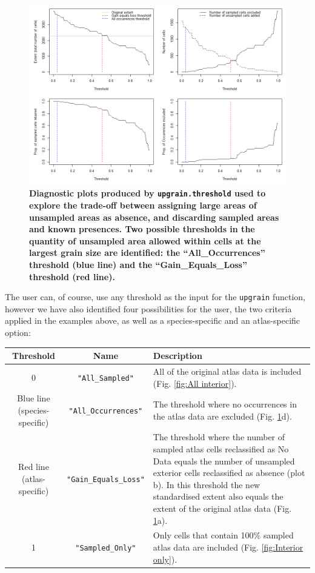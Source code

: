 \documentclass{article}[12pt, a4paper]
\begin{document}
\begin{figure}[ht]
\centering
\includegraphics[width=\linewidth]{Threshold_plots.png}
\caption{\textbf{Diagnostic plots produced by \texttt{upgrain.threshold} used to explore the trade-off  between assigning large areas of unsampled areas as absence, and discarding sampled areas and known presences. Two possible thresholds in the quantity of unsampled area allowed within cells at the largest grain size are identified: the “All\_Occurrences” threshold (blue line) and the “Gain\_Equals\_Loss” threshold (red line).}}
\label{fig:Threshold plots}
\end{figure}

The user can, of course, use any threshold as the input for the \texttt{upgrain} function, however we have also identified four possibilities for the user, the two criteria applied in the examples above, as well as a species-specific and an atlas-specific option: 

\begin{table}[!h]
\centering
\begin{tabular}{ c  c  p{6.2cm} }
\hline \noalign{\smallskip}
Threshold & Name & Description  \\
\hline \noalign{\smallskip}
0 & \texttt{"All\_Sampled"} & All of the original atlas data is included (Fig. \ref{fig:All interior}). \\ [0.2cm]

Blue line (species-specific) & \texttt{"All\_Occurrences"} & The threshold where no occurrences in the atlas data are excluded (Fig. \ref{fig:Threshold plots}d). \\ [0.2cm]

Red line (atlas-specific) & \texttt{"Gain\_Equals\_Loss"} & The threshold where the number of sampled atlas cells reclassified as No Data equals the number of unsampled exterior cells reclassified as absence (plot b). In this threshold the new standardised extent also equals the extent of the original atlas data (Fig. \ref{fig:Threshold plots}a). \\ [0.2cm]

1 & \texttt{"Sampled\_Only"} & Only cells that contain 100\% sampled atlas data are included (Fig. \ref{fig:Interior only}). \\ [0.1cm]
\hline
\end{tabular}
\end{table}
\end{document}

